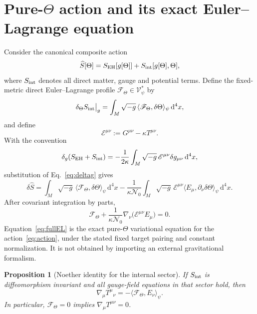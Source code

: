 \documentclass[11pt,a4paper]{article}
\newtheorem{proposition}[definition]{Proposition}
\theoremstyle{remark}
\newcommand{\E}{\mathscr E}
\newcommand{\F}{\mathscr F}
\newcommand{\Nzero}{\mathcal N_0}
\newcommand{\dd}{\mathrm d}
\begin{document}
\section{Pure-$\Theta$ action and its exact Euler--Lagrange equation}

Consider the canonical composite action
\begin{equation}
  \widehat S[\Theta]
  =S_{\rm EH}[g[\Theta]]+S_{\rm int}[g[\Theta],\Theta],
  \label{eq:action}
\end{equation}
where $S_{\rm int}$ denotes all direct matter, gauge and potential terms.
Define the fixed-metric direct Euler--Lagrange profile $\F_\Theta\in\mathscr
V_\psi^*$ by
\begin{equation}
 \delta_\Theta S_{\rm int}\big|_g
 =\int_M\sqrt{-g}\,\langle\F_\Theta,\delta\Theta\rangle_\psi\,\dd^4x,
 \label{eq:Ftheta}
\end{equation}
and define
\begin{equation}
  \E^{\mu\nu}:=G^{\mu\nu}-\kappa T^{\mu\nu}.
  \label{eq:Einres}
\end{equation}
With the convention
\begin{equation}
  \delta_g(S_{\rm EH}+S_{\rm int})
  =-\frac1{2\kappa}\int_M\sqrt{-g}\,
  \E^{\mu\nu}\delta g_{\mu\nu}\,\dd^4x,
\end{equation}
substitution of Eq.~\eqref{eq:deltag} gives
\begin{equation}
  \delta\widehat S
  =\int_M\sqrt{-g}\,\langle\F_\Theta,\delta\Theta\rangle_\psi\,\dd^4x
  -\frac1{\kappa\Nzero}\int_M\sqrt{-g}\,
   \E^{\mu\nu}\langle E_\mu,\partial_\nu\delta\Theta\rangle_\psi\,\dd^4x.
\end{equation}
After covariant integration by parts,
\begin{equation}
 \boxed{
 \F_\Theta
 +\frac1{\kappa\Nzero}
 \nabla_\nu\bigl(\E^{\mu\nu}E_\mu\bigr)=0.}
 \label{eq:fullEL}
\end{equation}
Equation~\eqref{eq:fullEL} is the exact pure-$\Theta$ variational equation for
the action~\eqref{eq:action}, under the stated fixed target pairing and constant
normalization.  It is not obtained by importing an external gravitational
formalism.

\begin{proposition}[Noether identity for the internal sector]
If $S_{\rm int}$ is diffeomorphism invariant and all gauge-field equations in
that sector hold, then
\begin{equation}
  \nabla_\mu T^{\mu}{}_{\nu}
  =-\langle\F_\Theta,E_\nu\rangle_\psi.
  \label{eq:noether}
\end{equation}
In particular, $\F_\Theta=0$ implies $\nabla_\mu T^{\mu\nu}=0$.
\end{proposition}
\end{document}
